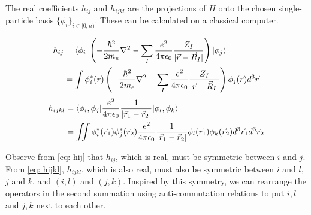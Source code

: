 The real coefficients $h_{ij}$ and $h_{ijkl}$ are the projections of $H$ onto the chosen single-particle basis $\{\phi_i\}_{i \in [0, n)}$. These can be calculated on a classical computer.

\begin{equation}
    \begin{split}
        h_{ij} &= \braket{\phi_i | \left(-\frac{\hbar^2}{2m_e}\nabla^2 - \sum_I \frac{e^2}{4\pi\epsilon_0}\frac{Z_I}{|\vec{r} - \vec{R}_I|}\right) | \phi_j} \\
        &= \int \phi^*_i(\vec{r})\left(-\frac{\hbar^2}{2m_e}\nabla^2 - \sum_I \frac{e^2}{4\pi\epsilon_0}\frac{Z_I}{|\vec{r} - \vec{R}_I|}\right)\phi_j(\vec{r}) d^3\vec{r}
    \end{split}
    \label{eq: hij}
\end{equation}
\begin{equation}
    \begin{split}
        h_{ijkl} &= \braket{\phi_i, \phi_j | \frac{e^2}{4\pi\epsilon_0}\frac{1}{|\vec{r}_1 - \vec{r}_2|} | \phi_l, \phi_k} \\
        &= \iint \phi^*_i(\vec{r}_1)\phi^*_j(\vec{r}_2)\frac{e^2}{4\pi\epsilon_0}\frac{1}{|\vec{r}_1 - \vec{r}_2|}\phi_l(\vec{r}_1)\phi_k(\vec{r}_2) d^3\vec{r}_1d^3\vec{r}_2
    \end{split}
    \label{eq: hijkl}
\end{equation}

Observe from \eqref{eq: hij} that $h_{ij}$, which is real, must be symmetric between $i$ and $j$. From \eqref{eq: hijkl}, $h_{ijkl}$, which is also real, must also be symmetric between $i$ and $l$, $j$ and $k$, and $(i, l)$ and $(j, k)$. Inspired by this symmetry, we can rearrange the operators in the second summation using anti-commutation relations to put $i, l$ and $j, k$ next to each other.

